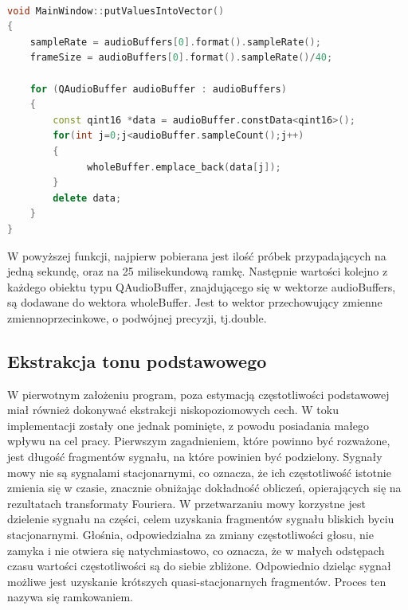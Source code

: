 \documentclass[a4paper,12 pt]{article}
\begin{document}
\begin{lstlisting}[caption={Funkcja dodająca do wektora wszystkie odczytane próbki},label={lst:label},language=C++]

void MainWindow::putValuesIntoVector()
{
    sampleRate = audioBuffers[0].format().sampleRate();
    frameSize = audioBuffers[0].format().sampleRate()/40;
    
    for (QAudioBuffer audioBuffer : audioBuffers)
    {
        const qint16 *data = audioBuffer.constData<qint16>();
        for(int j=0;j<audioBuffer.sampleCount();j++)
        {
              wholeBuffer.emplace_back(data[j]);
        }
        delete data;
    }
}
\end{lstlisting}
W powyższej funkcji, najpierw pobierana jest ilość próbek przypadających na jedną sekundę, oraz na 25 milisekundową ramkę. Następnie wartości kolejno z każdego obiektu typu QAudioBuffer, znajdującego się w wektorze audioBuffers, są dodawane do wektora wholeBuffer. Jest to wektor przechowujący zmienne
zmiennoprzecinkowe, o podwójnej precyzji, tj.double.

\subsection{Ekstrakcja tonu podstawowego}
W pierwotnym założeniu program, poza estymacją częstotliwości podstawowej miał również dokonywać ekstrakcji niskopoziomowych cech.
W toku implementacji zostały one jednak pominięte, z powodu posiadania małego wpływu na cel pracy. 
Pierwszym zagadnieniem, które powinno być rozważone, jest długość fragmentów sygnału, na które powinien być podzielony.
Sygnały mowy nie są sygnalami stacjonarnymi, co oznacza, że ich częstotliwość istotnie zmienia się w czasie, znacznie obniżając dokładność obliczeń, opierających się na rezultatach transformaty Fouriera.
W przetwarzaniu mowy korzystne jest dzielenie sygnału na części, celem uzyskania fragmentów sygnału bliskich byciu stacjonarnymi.
Głośnia, odpowiedzialna za zmiany częstotliwości głosu, nie zamyka i nie otwiera się natychmiastowo, co oznacza, że w małych odstępach czasu wartości częstotliwości są do siebie zbliżone.
Odpowiednio dzieląc sygnał możliwe jest uzyskanie krótszych  quasi-stacjonarnych fragmentów. Proces ten nazywa się ramkowaniem.
\end{document}
